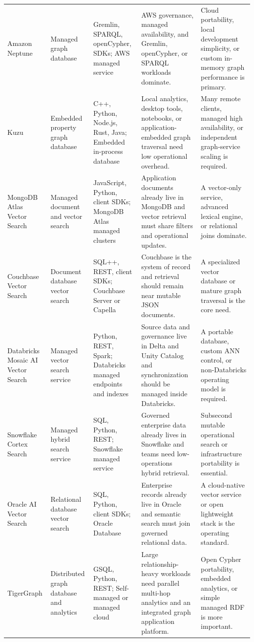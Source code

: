 \begin{longtable}{@{}p{20mm}p{22mm}p{26mm}p{46mm}p{46mm}@{}}
Amazon Neptune & Managed graph database & Gremlin, SPARQL, openCypher, SDKs; AWS managed service & AWS governance, managed availability, and Gremlin, openCypher, or SPARQL workloads dominate. & Cloud portability, local development simplicity, or custom in-memory graph performance is primary.\\
Kuzu & Embedded property graph database & C++, Python, Node.js, Rust, Java; Embedded in-process database & Local analytics, desktop tools, notebooks, or application-embedded graph traversal need low operational overhead. & Many remote clients, managed high availability, or independent graph-service scaling is required.\\
MongoDB Atlas Vector Search & Managed document and vector search & JavaScript, Python, client SDKs; MongoDB Atlas managed clusters & Application documents already live in MongoDB and vector retrieval must share filters and operational updates. & A vector-only service, advanced lexical engine, or relational joins dominate.\\
Couchbase Vector Search & Document database vector search & SQL++, REST, client SDKs; Couchbase Server or Capella & Couchbase is the system of record and retrieval should remain near mutable JSON documents. & A specialized vector database or mature graph traversal is the core need.\\
Databricks Mosaic AI Vector Search & Managed vector search service & Python, REST, Spark; Databricks managed endpoints and indexes & Source data and governance live in Delta and Unity Catalog and synchronization should be managed inside Databricks. & A portable database, custom ANN control, or non-Databricks operating model is required.\\
Snowflake Cortex Search & Managed hybrid search service & SQL, Python, REST; Snowflake managed service & Governed enterprise data already lives in Snowflake and teams need low-operations hybrid retrieval. & Subsecond mutable operational search or infrastructure portability is essential.\\
Oracle AI Vector Search & Relational database vector search & SQL, Python, client SDKs; Oracle Database & Enterprise records already live in Oracle and semantic search must join governed relational data. & A cloud-native vector service or open lightweight stack is the operating standard.\\
TigerGraph & Distributed graph database and analytics & GSQL, Python, REST; Self-managed or managed cloud & Large relationship-heavy workloads need parallel multi-hop analytics and an integrated graph application platform. & Open Cypher portability, embedded analytics, or simple managed RDF is more important.\\

\end{longtable}
